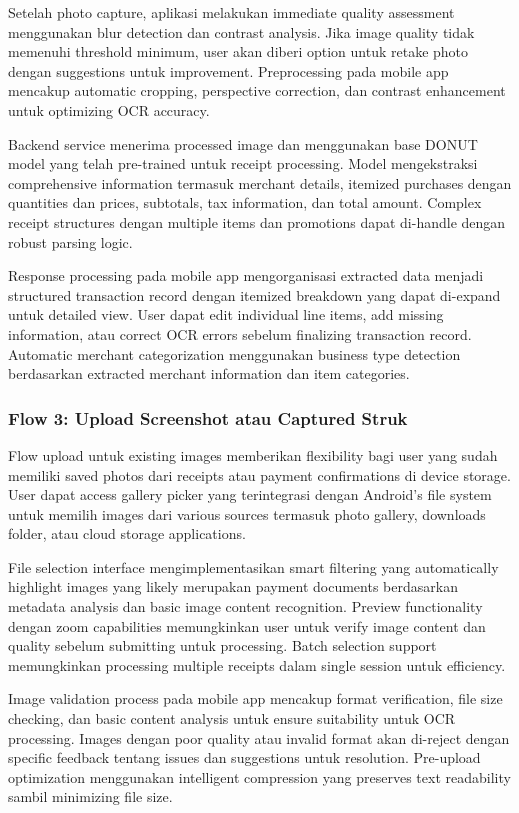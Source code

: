 Setelah photo capture, aplikasi melakukan immediate quality assessment menggunakan blur detection dan contrast analysis. Jika image quality tidak memenuhi threshold minimum, user akan diberi option untuk retake photo dengan suggestions untuk improvement. Preprocessing pada mobile app mencakup automatic cropping, perspective correction, dan contrast enhancement untuk optimizing OCR accuracy.

Backend service menerima processed image dan menggunakan base DONUT model yang telah pre-trained untuk receipt processing. Model mengekstraksi comprehensive information termasuk merchant details, itemized purchases dengan quantities dan prices, subtotals, tax information, dan total amount. Complex receipt structures dengan multiple items dan promotions dapat di-handle dengan robust parsing logic.

Response processing pada mobile app mengorganisasi extracted data menjadi structured transaction record dengan itemized breakdown yang dapat di-expand untuk detailed view. User dapat edit individual line items, add missing information, atau correct OCR errors sebelum finalizing transaction record. Automatic merchant categorization menggunakan business type detection berdasarkan extracted merchant information dan item categories.

\subsubsection{Flow 3: Upload Screenshot atau Captured Struk}
\label{subsubsec:flow-upload-receipt}

Flow upload untuk existing images memberikan flexibility bagi user yang sudah memiliki saved photos dari receipts atau payment confirmations di device storage. User dapat access gallery picker yang terintegrasi dengan Android's file system untuk memilih images dari various sources termasuk photo gallery, downloads folder, atau cloud storage applications.

File selection interface mengimplementasikan smart filtering yang automatically highlight images yang likely merupakan payment documents berdasarkan metadata analysis dan basic image content recognition. Preview functionality dengan zoom capabilities memungkinkan user untuk verify image content dan quality sebelum submitting untuk processing. Batch selection support memungkinkan processing multiple receipts dalam single session untuk efficiency.

Image validation process pada mobile app mencakup format verification, file size checking, dan basic content analysis untuk ensure suitability untuk OCR processing. Images dengan poor quality atau invalid format akan di-reject dengan specific feedback tentang issues dan suggestions untuk resolution. Pre-upload optimization menggunakan intelligent compression yang preserves text readability sambil minimizing file size.

